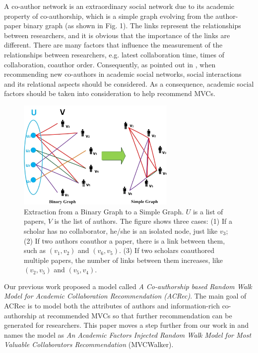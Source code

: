 \documentclass[10pt,journal,compsoc]{IEEEtran}
\begin{document}
A co-author network is an extraordinary social network due to its academic property of co-authorship, which is a simple graph evolving from the author-paper binary graph (as shown in Fig. 1). The links represent the relationships between researchers, and it is obvious that the importance of the links are different. There are many factors that influence the measurement of the relationships between researchers, e.g. latest collaboration time, times of collaboration, coauthor order. Consequently, as pointed out in \cite{Lopes:Colleboration}, when recommending new co-authors in academic social networks, social interactions and its relational aspects should be considered. As a consequence, academic social factors should be taken into consideration to help recommend MVCs.
\begin{figure}
\centering
\includegraphics [width=3in]{Fig1.jpg}
\caption{Extraction from a Binary Graph to a Simple Graph. $U$ is a list of papers, $V$ is the list of authors. The figure shows three cases: (1) If a scholar has no collaborator, he/she is an isolated node, just like $v_{3}$; (2) If two authors coauthor a paper, there is a link between them, such as $(v_{1}, v_{2})$ and $(v_{6}, v_{5})$. (3) If two scholars coauthored multiple papers, the number of links between them increases, like $(v_{2}, v_{5})$ and $(v_{5}, v_{4})$.}
\end{figure}

Our previous work \cite{Jing:ACRec} proposed a model called \emph{A Co-authorship based Random Walk Model for Academic Collaboration Recommendation (ACRec)}. The main goal of ACRec is to model both the attributes of authors and information-rich co-authorship at recommended MVCs so that further recommendation can be generated for researchers. This paper moves a step further from our work in \cite{Jing:ACRec} and names the model as \emph{An Academic Factors Injected Random Walk Model for Most Valuable Collaborators Recommendation} (MVCWalker).
\end{document}
